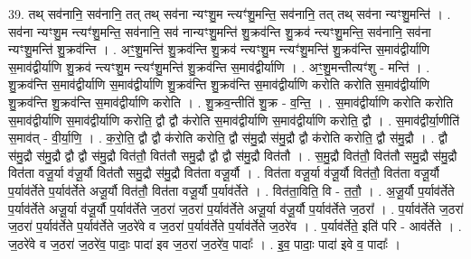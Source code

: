 \documentclass[17pt]{extarticle}
\begin{document}
39. तथ् सव॑नानि॒ सव॑नानि॒ तत् तथ् सव॑ना न्यꣳशु॒म न्त्यꣳ॑शु॒मन्ति॒ सव॑नानि॒ तत् तथ् सव॑ना 
न्यꣳशु॒मन्ति॑ । . सव॑ना न्यꣳशु॒म न्त्यꣳ॑शु॒मन्ति॒ सव॑नानि॒ सव॑ नान्यꣳशु॒मन्ति॑ शु॒क्रव॑न्ति 
शु॒क्रव॑ न्त्यꣳशु॒मन्ति॒ सव॑नानि॒ सव॑ना न्यꣳशु॒मन्ति॑ शु॒क्रव॑न्ति । . अꣳ॒॒शु॒मन्ति॑ शु॒क्रव॑न्ति शु॒क्रव॑ न्त्यꣳशु॒म न्त्यꣳ॑शु॒मन्ति॑ शु॒क्रव॑न्ति स॒माव॑द्वीर्याणि स॒माव॑द्वीर्याणि शु॒क्रव॑ न्त्यꣳशु॒म न्त्यꣳ॑शु॒मन्ति॑ शु॒क्रव॑न्ति स॒माव॑द्वीर्याणि । . अꣳ॒॒शु॒मन्तीत्यꣳ॑शु - मन्ति॑ । . शु॒क्रव॑न्ति स॒माव॑द्वीर्याणि स॒माव॑द्वीर्याणि शु॒क्रव॑न्ति शु॒क्रव॑न्ति स॒माव॑द्वीर्याणि करोति करोति स॒माव॑द्वीर्याणि शु॒क्रव॑न्ति शु॒क्रव॑न्ति स॒माव॑द्वीर्याणि करोति । . शु॒क्रव॒न्तीति॑ शु॒क्र - व॒न्ति॒ । . स॒माव॑द्वीर्याणि करोति करोति स॒माव॑द्वीर्याणि स॒माव॑द्वीर्याणि करोति॒ द्वौ द्वौ क॑रोति स॒माव॑द्वीर्याणि स॒माव॑द्वीर्याणि करोति॒ द्वौ । . स॒माव॑द्वीर्या॒णीति॑ स॒माव॑त् - वी॒र्या॒णि॒ । . क॒रो॒ति॒ द्वौ द्वौ क॑रोति करोति॒ द्वौ स॑मु॒द्रौ स॑मु॒द्रौ द्वौ क॑रोति करोति॒ द्वौ स॑मु॒द्रौ । . द्वौ स॑मु॒द्रौ स॑मु॒द्रौ द्वौ द्वौ स॑मु॒द्रौ वित॑तौ॒ वित॑तौ समु॒द्रौ द्वौ द्वौ स॑मु॒द्रौ वित॑तौ । . स॒मु॒द्रौ वित॑तौ॒ वित॑तौ समु॒द्रौ स॑मु॒द्रौ वित॑ता वजू॒र्या व॑जू॒र्यौ वित॑तौ समु॒द्रौ स॑मु॒द्रौ वित॑ता वजू॒र्यौ । . वित॑ता वजू॒र्या व॑जू॒र्यौ वित॑तौ॒ वित॑ता वजू॒र्यौ प॒र्याव॑र्तेते प॒र्याव॑र्तेते अजू॒र्यौ वित॑तौ॒ वित॑ता वजू॒र्यौ प॒र्याव॑र्तेते । . वित॑ता॒विति॒ वि - त॒तौ॒ । . अ॒जू॒र्यौ प॒र्याव॑र्तेते प॒र्याव॑र्तेते अजू॒र्या व॑जू॒र्यौ प॒र्याव॑र्तेते ज॒ठरा॑ ज॒ठरा॑ प॒र्याव॑र्तेते अजू॒र्या व॑जू॒र्यौ प॒र्याव॑र्तेते ज॒ठरा᳚ । . प॒र्याव॑र्तेते ज॒ठरा॑ ज॒ठरा॑ प॒र्याव॑र्तेते प॒र्याव॑र्तेते ज॒ठरे॑वे व ज॒ठरा॑ प॒र्याव॑र्तेते प॒र्याव॑र्तेते ज॒ठरे॑व । . प॒र्याव॑र्तेते॒ इति॑ परि - आव॑र्तेते । . ज॒ठरे॑वे व ज॒ठरा॑ ज॒ठरे॑व॒ पादाः॒ पादा॑ इव ज॒ठरा॑ ज॒ठरे॑व॒ पादाः᳚ । . इ॒व॒ पादाः॒ पादा॑ इवे व॒ पादाः᳚ । \newline
\end{document}
